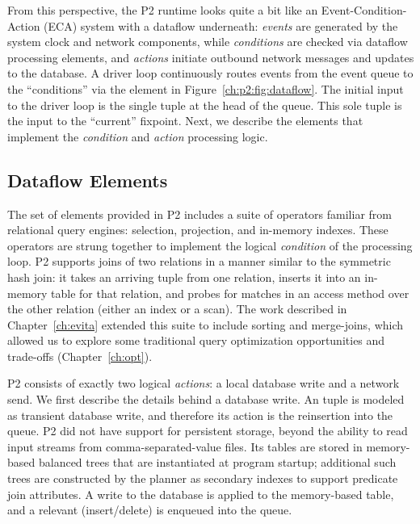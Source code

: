 From this perspective, the P2 runtime looks quite a bit like an
Event-Condition-Action (ECA) system with a dataflow underneath: {\em events}
are generated by the system clock and network components, while {\em
conditions} are checked via dataflow processing elements, and {\em actions}
initiate outbound network messages and updates to the database.  A driver loop
continuously routes events from the event queue to the ``conditions'' via the
 element in Figure~\ref{ch:p2:fig:dataflow}.  The initial input to
the driver loop is the single tuple at the head of the  queue.
This sole tuple is the input to the ``current'' fixpoint.  Next, we
describe the elements that implement the {\em condition} and {\em action}
processing logic.

\subsection{Dataflow Elements} 
\label{ch:p2:sec:dataflow_elements}

The set of elements provided in P2 includes a suite of operators familiar from
relational query engines: selection, projection, and in-memory indexes.  These
operators are strung together to implement the logical {\em condition} of the 
processing loop.  P2 supports joins of two relations in a manner similar to the
symmetric hash join: it takes an arriving tuple from one relation, inserts it
into an in-memory table for that relation, and probes for matches in an access
method over the other relation (either an index or a scan).  The work described
in Chapter~\ref{ch:evita} extended this suite to include sorting and
merge-joins, which allowed us to explore some traditional query optimization
opportunities and trade-offs (Chapter~\ref{ch:opt}).

P2 consists of exactly two logical {\em actions}: a local database write and a
network send.  We first describe the details behind a database write.  An
 tuple is modeled as transient database write, and therefore its
action is the reinsertion into the  queue.  P2 did not have support
for persistent storage, beyond the ability to read input streams from
comma-separated-value files.  Its tables are stored in memory-based balanced
trees that are instantiated at program startup; additional such trees are
constructed by the planner as secondary indexes to support predicate join
attributes.  A write to the database is applied to the memory-based table, and
a relevant (insert/delete)  is enqueued into the  queue.

